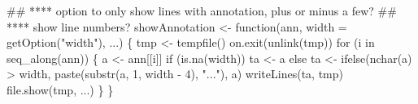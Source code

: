 \documentclass[11pt]{article}
\begin{document}
\begin{nwchunk}
 ## **** option to only show lines with annotation, plus or minus a few?
 ## **** show line numbers?
 showAnnotation <- function(ann, width = getOption("width"), ...) \{
     tmp <- tempfile()
     on.exit(unlink(tmp))
     for (i in seq_along(ann)) \{
         a <- ann[[i]]
         if (is.na(width))
             ta <- a
         else
             ta <- ifelse(nchar(a) > width,
                          paste(substr(a, 1, width - 4), "..."),
                          a)
         writeLines(ta, tmp)
         file.show(tmp, ...)
     \}
 \}
\end{nwchunk}
\end{document}

